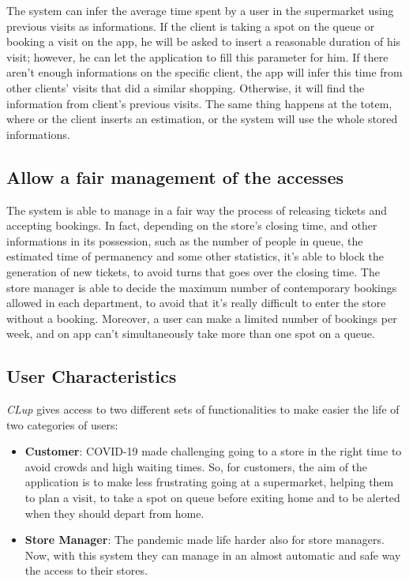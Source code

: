 \documentclass{article}
\begin{document}
		The system can infer the average time spent by a user in the supermarket using previous visits as informations. If the client is taking a spot on the queue or booking a visit on the app, he will be asked to insert a reasonable duration of his visit; however, he can let the application to fill this parameter for him. If there aren't enough informations on the specific client, the app will infer this time from other clients' visits that did a similar shopping. Otherwise, it will find the information from client's previous visits. The same thing happens at the totem, where or the client inserts an estimation, or the system will use the whole stored informations.
		
		\subsection{Allow a fair management of the accesses}
		The system is able to manage in a fair way the process of releasing tickets and accepting bookings. In fact, depending on the store's closing time, and other informations in its possession, such as the number of people in queue, the estimated time of permanency and some other statistics, it's able to block the generation of new tickets, to avoid turns that goes over the closing time. The store manager is able to decide the maximum number of contemporary bookings allowed in each department, to avoid that it's really difficult to enter the store without a booking. Moreover, a user can make a limited number of bookings per week, and on app can't simultaneously take more than one spot on a queue. \\

	\bigskip
	\subsection{User Characteristics}
	
	\emph{CLup} gives access to two different sets of functionalities to make easier the life of two categories of users:
	
	\bigskip
	\begin{itemize}
		
		\item {\bfseries Customer}: COVID-19 made challenging going to a store in the right time to avoid crowds and high waiting times. So, for customers, the aim of the application is to make less frustrating going at a supermarket, helping them to plan a visit, to take a spot on queue before exiting home and to be alerted when they should depart from home. \\
		
		\item {\bfseries Store Manager}: The pandemic made life harder also for store managers. Now, with this system they can manage in an almost automatic and safe way the access to their stores. \\
		
	\end{itemize}
\end{document}
